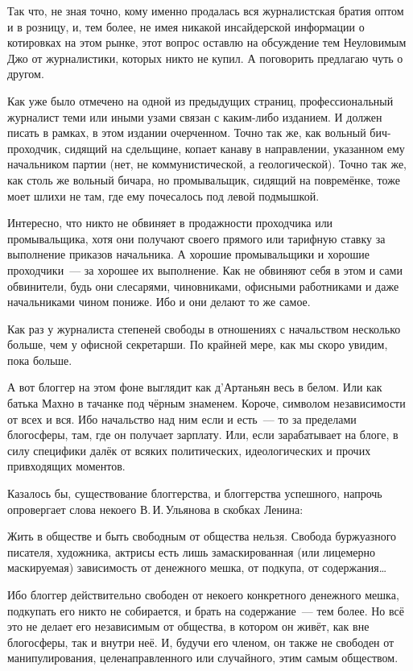 Так что, не зная точно, кому именно продалась вся журналистская братия оптом и в розницу, и, тем более, не имея никакой инсайдерской информации о котировках на этом рынке, этот вопрос оставлю на обсуждение тем Неуловимым Джо от журналистики, которых никто не купил. А поговорить предлагаю чуть о другом.

Как уже было отмечено на одной из предыдущих страниц, профессиональный журналист теми или иными узами связан с каким-либо изданием. И должен писать в рамках, в этом издании очерченном. Точно так же, как вольный бич-проходчик, сидящий на сдельщине, копает канаву в направлении, указанном ему начальником партии (нет, не коммунистической, а геологической). Точно так же, как столь же вольный бичара, но промывальщик, сидящий на повремёнке, тоже моет шлихи не там, где ему почесалось под левой подмышкой.

Интересно, что никто не обвиняет в продажности проходчика или промывальщика, хотя они получают своего прямого или тарифную ставку за выполнение приказов начальника. А хорошие промывальщики и хорошие проходчики~--- за хорошее их выполнение. Как не обвиняют себя в этом и сами обвинители, будь они слесарями, чиновниками, офисными работниками и даже начальниками чином пониже. Ибо и они делают то же самое.

Как раз у журналиста степеней свободы в отношениях с начальством несколько больше, чем у офисной секретарши. По крайней мере, как мы скоро увидим, пока больше.

А вот блоггер на этом фоне выглядит как д'Артаньян весь в белом. Или как батька Махно в тачанке под чёрным знаменем. Короче, символом независимости от всех и вся. Ибо начальство над ним если и есть~--- то за пределами блогосферы, там, где он получает зарплату. Или, если зарабатывает на блоге, в силу специфики далёк от всяких политических, идеологических и прочих привходящих моментов.

Казалось бы, существование блоггерства, и блоггерства успешного, напрочь опровергает слова некоего 
В.\,И.\,Ульянова в скобках Ленина:


\begin{shadequote}{}
Жить в обществе и быть свободным от общества нельзя. Свобода буржуазного писателя, художника, актрисы есть лишь замаскированная (или лицемерно маскируемая) зависимость от денежного мешка, от подкупа, от содержания\dots
\end{shadequote}

Ибо блоггер действительно свободен от некоего конкретного денежного мешка, подкупать его никто не собирается, и брать на содержание~--- тем более. Но всё это не делает его независимым от общества, в котором он живёт, как вне блогосферы, так и внутри неё. И, будучи его членом, он также не свободен от манипулирования, целенаправленного или случайного, этим самым обществом.

